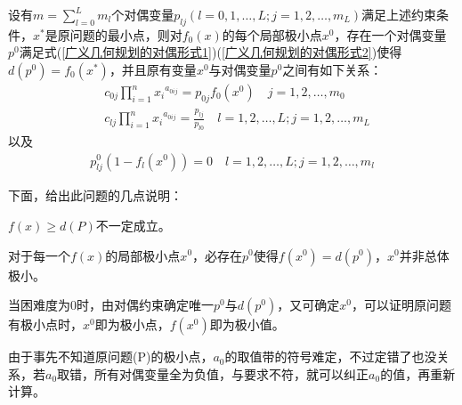         \begin{theorem}
        设有$m=\mathop{\sum}\limits_{l=0}^{L}m_l$个对偶变量$p_{lj}(l=0,1,\ldots,L;j=1,2,\ldots,m_L)$满足上述约束条件，$x^*$是原问题的最小点，则对$f_0(x)$的每个局部极小点$x^0$，存在一个对偶变量$p^0$满足式(\ref{广义几何规划的对偶形式1})(\ref{广义几何规划的对偶形式2})使得$d(p^0)=f_0(x^*)$，并且原有变量$x^0$与对偶变量$p^0$之间有如下关系：
        \begin{align*}
        &c_{0j}\mathop{\prod}\limits_{i=1}^{n}{x_i}^{a_{0ij}}=p_{0j}f_{0}(x^0)\quad j=1,2,\ldots,m_0\\
        &c_{lj}\mathop{\prod}\limits_{i=1}^{n}{x_i}^{a_{0ij}}=\frac{p_{lj}}{p_{l0}} \quad l=1,2,\ldots,L;j=1,2,\ldots,m_L
        \end{align*}
        以及
        \begin{align*}
        p_{lj}^0(1-f_l(x^0))=0 \quad l=1,2,\ldots,L;j=1,2,\ldots,m_l
        \end{align*}
        \end{theorem}
        \par
        下面，给出此问题的几点说明：\par
        $f(x)\geqslant d(P)$不一定成立。\par
        对于每一个$f(x)$的局部极小点$x^0$，必存在$p^0$使得$f(x^0)=d(p^0)$，$x^0$并非总体极小。
        \par
        当困难度为0时，由对偶约束确定唯一$p^0$与$d(p^0)$，又可确定$x^0$，可以证明原问题有极小点时，$x^0$即为极小点，$f(x^0)$即为极小值。
        \par
        由于事先不知道原问题(P)的极小点，$a_0$的取值带的符号难定，不过定错了也没关系，若$a_0$取错，所有对偶变量全为负值，与要求不符，就可以纠正$a_0$的值，再重新计算。
